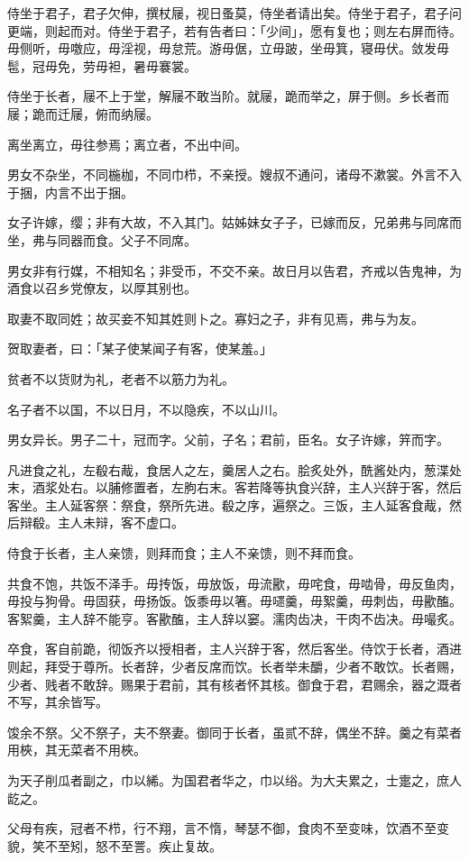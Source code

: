 \documentclass[]{article}
\begin{document}
侍坐于君子，君子欠伸，撰杖屦，视日蚤莫，侍坐者请出矣。侍坐于君子，君子问更端，则起而对。侍坐于君子，若有告者曰：「少间」，愿有复也；则左右屏而待。毋侧听，毋噭应，毋淫视，毋怠荒。游毋倨，立毋跛，坐毋箕，寝毋伏。敛发毋髢，冠毋免，劳毋袒，暑毋褰裳。

侍坐于长者，屦不上于堂，解屦不敢当阶。就屦，跪而举之，屏于侧。乡长者而屦；跪而迁屦，俯而纳屦。

离坐离立，毋往参焉；离立者，不出中间。

男女不杂坐，不同椸枷，不同巾栉，不亲授。嫂叔不通问，诸母不漱裳。外言不入于捆，内言不出于捆。

女子许嫁，缨；非有大故，不入其门。姑姊妹女子子，已嫁而反，兄弟弗与同席而坐，弗与同器而食。父子不同席。

男女非有行媒，不相知名；非受币，不交不亲。故日月以告君，齐戒以告鬼神，为酒食以召乡党僚友，以厚其别也。

取妻不取同姓；故买妾不知其姓则卜之。寡妇之子，非有见焉，弗与为友。

贺取妻者，曰：「某子使某闻子有客，使某羞。」

贫者不以货财为礼，老者不以筋力为礼。

名子者不以国，不以日月，不以隐疾，不以山川。

男女异长。男子二十，冠而字。父前，子名；君前，臣名。女子许嫁，笄而字。

凡进食之礼，左殽右胾，食居人之左，羹居人之右。脍炙处外，酰酱处内，葱渫处末，酒浆处右。以脯修置者，左朐右末。客若降等执食兴辞，主人兴辞于客，然后客坐。主人延客祭：祭食，祭所先进。殽之序，遍祭之。三饭，主人延客食胾，然后辩殽。主人未辩，客不虚口。

侍食于长者，主人亲馈，则拜而食；主人不亲馈，则不拜而食。

共食不饱，共饭不泽手。毋抟饭，毋放饭，毋流歠，毋咤食，毋啮骨，毋反鱼肉，毋投与狗骨。毋固获，毋扬饭。饭黍毋以箸。毋嚃羹，毋絮羹，毋刺齿，毋歠醢。客絮羹，主人辞不能亨。客歠醢，主人辞以窭。濡肉齿决，干肉不齿决。毋嘬炙。

卒食，客自前跪，彻饭齐以授相者，主人兴辞于客，然后客坐。侍饮于长者，酒进则起，拜受于尊所。长者辞，少者反席而饮。长者举未釂，少者不敢饮。长者赐，少者、贱者不敢辞。赐果于君前，其有核者怀其核。御食于君，君赐余，器之溉者不写，其余皆写。

馂余不祭。父不祭子，夫不祭妻。御同于长者，虽贰不辞，偶坐不辞。羹之有菜者用梜，其无菜者不用梜。

为天子削瓜者副之，巾以絺。为国君者华之，巾以绤。为大夫累之，士疐之，庶人龁之。

父母有疾，冠者不栉，行不翔，言不惰，琴瑟不御，食肉不至变味，饮酒不至变貌，笑不至矧，怒不至詈。疾止复故。
\end{document}
